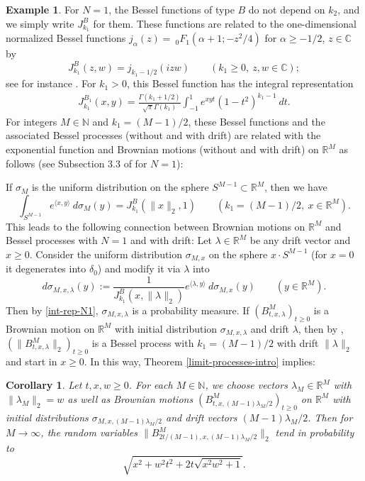 \documentclass[reqno]{amsart}
\theoremstyle{plain}
\newtheorem{corollary}[theorem]{Corollary}
\theoremstyle{definition}
\newtheorem{example}[theorem]{Example}
\numberwithin{equation}{section}
\newcommand{\R}{\mathbb{R}}
\begin{document}
\begin{example}\label{1-dim-example} For $N=1$, the Bessel functions of type $B$ do not depend on $k_2$, and we simply write $J_{k_1}^B$ for them.
  These functions are related to the one-dimensional normalized Bessel functions
  $j_\alpha(z)=\>_0F_1(\alpha+1; -z^2/4)$ for $\alpha\ge-1/2$, $z\in\mathbb C$ by
  $$J_{k_1}^B(z,w)=j_{k_1-1/2}(izw) \quad\quad(k_1\ge0,\> z,w\in\mathbb C);$$
  see for instance \cite{R4}. For $k_1>0$,  this Bessel function has the integral representation
\begin{align}\label{Integralformel 1D Besselfunktion}
J_{k_1}^{B_1}(x,y)=\frac{\Gamma(k_1+1/2)}{\sqrt\pi\Gamma(k_1)} \int_{-1}^{1} e^{xyt} (1-t^2)^{k_1-1}\> dt.
\end{align}
      For integers $M\in\mathbb N$ and $k_1=(M-1)/2$,
  these Bessel functions and the associated Bessel processes (without and with drift) are related with the exponential function and Brownian motions
  (without and with drift) on $\mathbb R^M$ as follows (see Subsection 3.3 of \cite{V2} for $N=1$):

  If $\sigma_M$ is the uniform distribution on the sphere $S^{M-1}\subset \mathbb R^M$, then we have
\begin{equation}\label{int-rep-N1}
  \int_{S^{M-1}} e^{\langle x,y\rangle} \> d\sigma_M(y)= J^B_{k_1}(\|x\|_2,1) \quad\quad(k_1=(M-1)/2, \> x\in  \mathbb R^M).\end{equation}
  This leads to the following connection between Brownian motions on $\mathbb R^M$ and Bessel processes with $N=1$ and with drift:
  Let $\lambda\in\mathbb R^M$ be any drift vector and $x\ge0$. Consider the uniform distribution $\sigma_{M,x}$ on the sphere $x\cdot S^{M-1}$ (for $x=0$ it
  degenerates into $\delta_0$) and modify it via $\lambda$ into
  $$d\sigma_{M,x,\lambda}(y):=\frac{1}{J^B_{k_1}(x,\|\lambda\|_2)} e^{\langle \lambda,y\rangle} \> d\sigma_{M,x}(y) \quad\quad(y\in  \mathbb R^M).$$
  Then by \eqref{int-rep-N1}, $\sigma_{M,x,\lambda}$ is a probability measure.
  If $(B^M_{t,x,\lambda})_{t\ge0}$ is a Brownian motion on  $\mathbb R^M$ with initial distribution  $\sigma_{M,x,\lambda}$ and drift $\lambda$, then by \cite{V2},
  $(\|B^M_{t,x,\lambda}\|_2)_{t\ge0}$ is a Bessel process with $k_1=(M-1)/2$ with drift $\|\lambda\|_2$ and start in $x\ge0$.
In this way,  Theorem \ref{limit-processes-intro} implies:
 \end{example}


\begin{corollary} \label{limit-processes-intro-cor-1dim} 
  Let   $t,x,w \geq 0$. For each $M\in\mathbb N$, we choose vectors $\lambda_M\in \R^M$ with $\|\lambda_M\|_2=w$ as well as 
  Brownian motions  $(B^M_{t,x,(M-1)\lambda_M/2})_{t\ge0}$ on  $\mathbb R^M$ with initial distributions $\sigma_{M,x,(M-1)\lambda_M/2}$ and drift
  vectors $(M-1)\lambda_M/2$.
Then for $M \to \infty$, the random variables $\| B^M_{2t/(M-1),x,(M-1)\lambda_M/2}  \|_2$ tend in probability to
$$ \sqrt{x^2 + w^2 t^2 + 2t \sqrt{x^2 w^2 + 1}}.$$
  \end{corollary}
\end{document}
